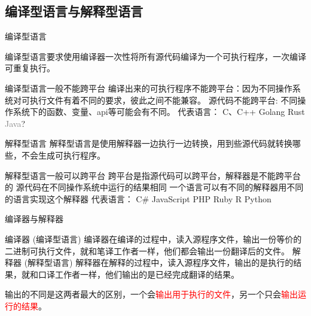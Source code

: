 \subsection{编译型语言与解释型语言}


\begin{frame}{编译型语言}

    编译型语言要求使用编译器一次性将所有源代码编译为一个可执行程序，一次编译可重复执行。

    \begin{myoutline}
        \1 编译型语言一般不能跨平台
            \2 编译出来的可执行程序不能跨平台：因为不同操作系统对可执行文件有着不同的要求，彼此之间不能兼容。
            \2 源代码不能跨平台: 不同操作系统下的函数、变量、api等可能会有不同。
        \1 代表语言：
            \2 C、C++
            \2 Golang
            \2 Rust
            \2 \textcolor{gray}{Java}?
    \end{myoutline}

\end{frame}
\begin{frame}{解释型语言}
    解释型语言是使用解释器一边执行一边转换，用到些源代码就转换哪些，不会生成可执行程序。
    \begin{myoutline}
        \1 解释型语言一般可以跨平台
            \2 跨平台是指源代码可以跨平台，解释器是不能跨平台的
            \2 源代码在不同操作系统中运行的结果相同
            \2 一个语言可以有不同的解释器用不同的语言实现这个解释器
        \1 代表语言：
            \2 C\#
            \2 JavaScript
            \2 PHP
            \2 Ruby
            \2 R
            \2 Python
    \end{myoutline}
\end{frame}

\begin{frame}{编译器与解释器}
    \begin{myoutline}
        \1 编译器 (编译型语言)
            \2 编译器在编译的过程中，读入源程序文件，输出一份等价的二进制可执行文件，就和笔译工作者一样，他们都会输出一份翻译后的文件。
        \1 解释器 (解释型语言)
            \2 解释器在解释的过程中，读入源程序文件，输出的是执行的结果，就和口译工作者一样，他们输出的是已经完成翻译的结果。
    \end{myoutline}
    \bigskip
    \bigskip
    \bigskip
    \centering

    \small{输出的不同是这两者最大的区别，一个会\textcolor{red}{输出用于执行的文件}，另一个只会\textcolor{red}{输出运行的结果}。}
\end{frame}


